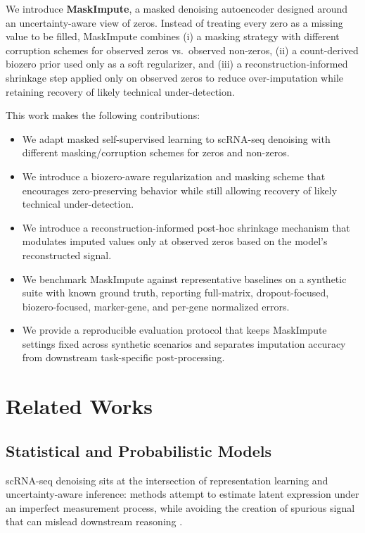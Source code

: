 \documentclass{article}
\theoremstyle{plain}
\theoremstyle{definition}
\theoremstyle{remark}
\newenvironment{compitemize}
  {\begin{itemize}[noitemsep, topsep=0pt, parsep=0pt, partopsep=0pt]}
  {\end{itemize}}
\begin{document}
We introduce \textbf{MaskImpute}, a masked denoising autoencoder designed around
an uncertainty-aware view of zeros. Instead of treating every zero as a missing
value to be filled, MaskImpute combines (i) a masking strategy with different
corruption schemes for observed zeros vs.\ observed non-zeros, (ii) a
count-derived biozero prior used only as a soft regularizer, and (iii) a
reconstruction-informed shrinkage step applied only on observed zeros to reduce
over-imputation while retaining recovery of likely technical under-detection.

This work makes the following contributions:
\begin{compitemize}
  \item We adapt masked self-supervised learning to scRNA-seq denoising with different masking/corruption schemes for zeros and non-zeros.
  \item We introduce a biozero-aware regularization and masking scheme that encourages zero-preserving behavior while still allowing recovery of likely technical under-detection.
  \item We introduce a reconstruction-informed post-hoc shrinkage mechanism that modulates imputed values only at observed zeros based on the model's reconstructed signal.
  \item We benchmark MaskImpute against representative baselines on a synthetic suite with known ground truth, reporting full-matrix, dropout-focused, biozero-focused, marker-gene, and per-gene normalized errors.
  \item We provide a reproducible evaluation protocol that keeps MaskImpute settings fixed across synthetic scenarios and separates imputation accuracy from downstream task-specific post-processing.
\end{compitemize}

\section{Related Works}

\subsection{Statistical and Probabilistic Models}
scRNA-seq denoising sits at the intersection of representation learning and uncertainty-aware inference: methods attempt to estimate latent expression under an imperfect measurement process, while avoiding the creation of spurious signal that can mislead downstream reasoning \citep{SarkarStephens2021SeparatingMeasurement, Hou2020ImputationBenchmark, Linderman2022ZeroPreserving}.
\end{document}
